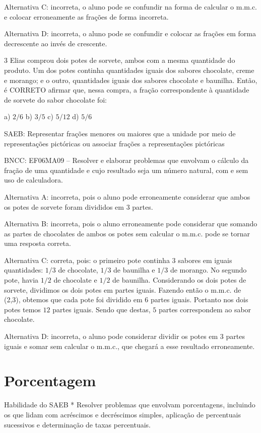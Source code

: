 Alternativa C: incorreta, o aluno pode se confundir na forma de calcular
o m.m.c. e colocar erroneamente as frações de forma incorreta.

Alternativa D: incorreta, o aluno pode se confundir e colocar as frações
em forma decrescente ao invés de crescente.

\num{3}  Elias comprou dois potes de sorvete, ambos com a mesma quantidade do
produto. Um dos potes continha quantidades iguais dos sabores chocolate,
creme e morango; e o outro, quantidades iguais dos sabores chocolate e
baunilha. Então, é CORRETO afirmar que, nessa compra, a fração
correspondente à quantidade de sorvete do sabor chocolate foi:

a) $2/6$ b) $3/5$ c) $5/12$ d) $5/6$

SAEB: Representar frações menores ou maiores que a unidade por meio de
representações pictóricas ou associar frações a representações
pictóricas

BNCC: EF06MA09 -- Resolver e elaborar problemas que envolvam o cálculo
da fração de uma quantidade e cujo resultado seja um número natural, com
e sem uso de calculadora.

Alternativa A: incorreta, pois o aluno pode erroneamente considerar que
ambos os potes de sorvete foram divididos em $3$ partes.

Alternativa B: incorreta, pois o aluno erroneamente pode considerar que
somando as partes de chocolates de ambos os potes sem calcular o m.m.c.
pode se tornar uma resposta correta.

Alternativa C: correta, pois: o primeiro pote continha $3$ sabores em
iguais quantidades: $1/3$ de chocolate, $1/3$ de baunilha e $1/3$ de morango.
No segundo pote, havia $1/2$ de chocolate e $1/2$ de baunilha. Considerando
os dois potes de sorvete, dividimos os dois potes em partes iguais.
Fazendo então o m.m.c. de (2,3), obtemos que cada pote foi dividido em $6$
partes iguais. Portanto nos dois potes temos $12$ partes iguais. Sendo que
destas, $5$ partes correspondem ao sabor chocolate.

Alternativa D: incorreta, o aluno pode considerar dividir os potes em $3$
partes iguais e somar sem calcular o m.m.c., que chegará a esse
resultado erroneamente.

\chapter{Porcentagem}

Habilidade do SAEB * Resolver problemas que envolvam porcentagens,
incluindo os que lidam com acréscimos e decréscimos simples, aplicação
de percentuais sucessivos e determinação de taxas percentuais.

